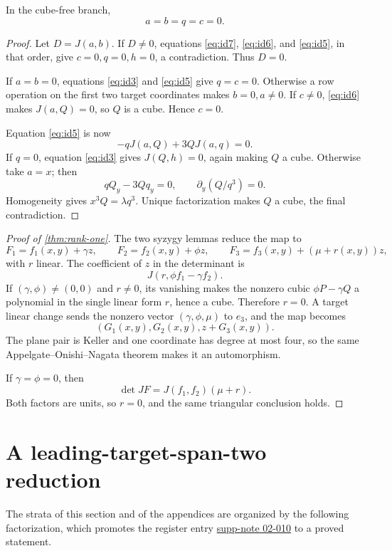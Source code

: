 \documentclass[11pt,reqno]{amsart}
\begin{document}
\begin{lemma}
\label{lem:second-syzygy}
In the cube-free branch,
\[
a=b=q=c=0.
\]
\end{lemma}

\begin{proof}
Let \(D=J(a,b)\).  If \(D\ne0\), equations
\eqref{eq:id7}, \eqref{eq:id6}, and \eqref{eq:id5}, in that order, give
\(c=0,q=0,h=0\), a contradiction.  Thus \(D=0\).

If \(a=b=0\), equations \eqref{eq:id3} and \eqref{eq:id5} give
\(q=c=0\).  Otherwise a row operation on the first two target coordinates
makes \(b=0,a\ne0\).  If \(c\ne0\), \eqref{eq:id6} makes
\(J(a,Q)=0\), so \(Q\) is a cube.  Hence \(c=0\).

Equation \eqref{eq:id5} is now
\[
-qJ(a,Q)+3QJ(a,q)=0.
\]
If \(q=0\), equation \eqref{eq:id3} gives \(J(Q,h)=0\), again making
\(Q\) a cube.  Otherwise take \(a=x\); then
\[
qQ_y-3Qq_y=0,
\qquad
\partial_y(Q/q^3)=0.
\]
Homogeneity gives \(x^3Q=\lambda q^3\).  Unique factorization makes \(Q\)
a cube, the final contradiction.
\end{proof}

\begin{proof}[Proof of \cref{thm:rank-one}]
The two syzygy lemmas reduce the map to
\[
F_1=f_1(x,y)+\gamma z,\qquad
F_2=f_2(x,y)+\phi z,\qquad
F_3=f_3(x,y)+(\mu+r(x,y))z,
\]
with \(r\) linear.  The coefficient of \(z\) in the determinant is
\[
J(r,\phi f_1-\gamma f_2).
\]
If \((\gamma,\phi)\ne(0,0)\) and \(r\ne0\), its vanishing makes the
nonzero cubic \(\phi P-\gamma Q\) a polynomial in the single linear form
\(r\), hence a cube.  Therefore \(r=0\).  A target linear change sends the
nonzero vector \((\gamma,\phi,\mu)\) to \(e_3\), and the map becomes
\[
(G_1(x,y),G_2(x,y),z+G_3(x,y)).
\]
The plane pair is Keller and one coordinate has degree at most four, so the
same Appelgate--Onishi--Nagata theorem
\cite{appelgateOnishi1985}\cite[Theorem~7.3]{nagata1988two} makes it an
automorphism.

If \(\gamma=\phi=0\), then
\[
\det JF=J(f_1,f_2)(\mu+r).
\]
Both factors are units, so \(r=0\), and the same triangular conclusion
holds.
\end{proof}

\section{A leading-target-span-two reduction}
\label{sec:span-two}

The strata of this section and of the appendices are organized by the
following factorization, which promotes the register entry
\hyperref[supp-note-02-010]{supp-note 02-010} to a proved statement.
\end{document}
